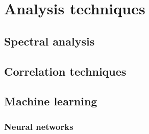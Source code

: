 \section{Analysis techniques}

\subsection{Spectral analysis}

\subsection{Correlation techniques}

\subsection{Machine learning}

\subsubsection{Neural networks}
